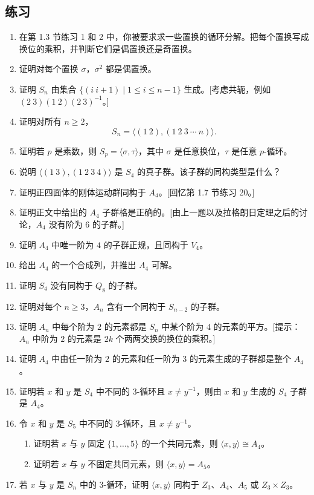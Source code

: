\subsection*{练习}
\begin{enumerate}[label=\arabic*.]
  \item 在第 1.3 节练习 1 和 2 中，你被要求求一些置换的循环分解。把每个置换写成换位的乘积，并判断它们是偶置换还是奇置换。
  \item 证明对每个置换 $\sigma$，$\sigma^2$ 都是偶置换。
  \item 证明 $S_n$ 由集合 $\{(i\ i+1)\mid 1\leq i\leq n-1\}$ 生成。[考虑共轭，例如 $(2\ 3)(1\ 2)(2\ 3)^{-1}$。]
  \item 证明对所有 $n\geq2$，
  \[
    S_n=\langle(1\ 2),(1\ 2\ 3\ \cdots\ n)\rangle.
  \]
  \item 证明若 $p$ 是素数，则 $S_p=\langle\sigma,\tau\rangle$，其中 $\sigma$ 是任意换位，$\tau$ 是任意 $p$-循环。
  \item 说明 $\langle(1\ 3),(1\ 2\ 3\ 4)\rangle$ 是 $S_4$ 的真子群。该子群的同构类型是什么？
  \item 证明正四面体的刚体运动群同构于 $A_4$。[回忆第 1.7 节练习 20。]
  \item 证明正文中给出的 $A_4$ 子群格是正确的。[由上一题以及拉格朗日定理之后的讨论，$A_4$ 没有阶为 $6$ 的子群。]
  \item 证明 $A_4$ 中唯一阶为 $4$ 的子群正规，且同构于 $V_4$。
  \item 给出 $A_4$ 的一个合成列，并推出 $A_4$ 可解。
  \item 证明 $S_4$ 没有同构于 $Q_8$ 的子群。
  \item 证明对每个 $n\geq3$，$A_n$ 含有一个同构于 $S_{n-2}$ 的子群。
  \item 证明 $A_n$ 中每个阶为 $2$ 的元素都是 $S_n$ 中某个阶为 $4$ 的元素的平方。[提示：$A_n$ 中阶为 $2$ 的元素是 $2k$ 个两两交换的换位的乘积。]
  \item 证明 $A_4$ 中由任一阶为 $2$ 的元素和任一阶为 $3$ 的元素生成的子群都是整个 $A_4$。
  \item 证明若 $x$ 和 $y$ 是 $S_4$ 中不同的 $3$-循环且 $x\neq y^{-1}$，则由 $x$ 和 $y$ 生成的 $S_4$ 子群是 $A_4$。
  \item 令 $x$ 和 $y$ 是 $S_5$ 中不同的 $3$-循环，且 $x\neq y^{-1}$。
  \begin{enumerate}[label=(\alph*)]
    \item 证明若 $x$ 与 $y$ 固定 $\{1,
    \ldots,5\}$ 的一个共同元素，则 $\langle x,y\rangle\cong A_4$。
    \item 证明若 $x$ 与 $y$ 不固定共同元素，则 $\langle x,y\rangle=A_5$。
  \end{enumerate}
  \item 若 $x$ 与 $y$ 是 $S_n$ 中的 $3$-循环，证明 $\langle x,y\rangle$ 同构于 $Z_3$、$A_4$、$A_5$ 或 $Z_3\times Z_3$。
\end{enumerate}
